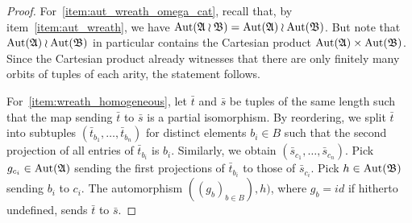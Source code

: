\begin{proof}
For~\eqref{item:aut_wreath_omega_cat}, recall that, by item~\eqref{item:aut_wreath}, we have $\mathrm{Aut}(\mathfrak{A} \wr \mathfrak{B})=\mathrm{Aut}(\mathfrak{A}) \wr \mathrm{Aut}(\mathfrak{B})$.
%
But note that $\mathrm{Aut}(\mathfrak{A}) \wr \mathrm{Aut}(\mathfrak{B})$ in particular contains the Cartesian product $\mathrm{Aut}(\mathfrak{A})\times \mathrm{Aut}(\mathfrak{B})$. 
%
% 
Since the Cartesian product already witnesses that there are only finitely many orbits of tuples of each arity, the statement follows. 

For~\eqref{item:wreath_homogeneous}, let $\bar{t}$ and $\bar{s}$ be tuples of the same length such that the map sending $\bar{t}$ to $\bar{s}$ is a partial isomorphism. 
%
By reordering, we split $\bar{t}$ into subtuples $(\bar{t}_{b_1},\dots,\bar{t}_{b_n})$ for distinct elements $b_i\in B$ such that the second  projection of all entries of $\bar{t}_{b_i}$ is  $b_i$. Similarly, we obtain $(\bar{s}_{c_1},\dots,\bar{s}_{c_n})$. Pick $g_{c_i}\in\mathrm{Aut}(\mathfrak{A})$  sending the first projections of $\bar{t}_{b_i}$ to those of $\bar{s}_{c_i}$. Pick $h\in\mathrm{Aut}(\mathfrak{B})$ sending $b_i$ to  $c_i$. The automorphism $((g_b)_{b\in B}),h)$, where $g_b=id$ if hitherto undefined, sends $\bar{t}$ to $\bar{s}$.


\end{proof}
